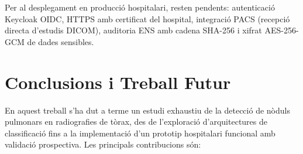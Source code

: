 \documentclass[conference]{IEEEtran}
\begin{document}
Per al desplegament en producció hospitalari, resten pendents: autenticació Keycloak OIDC, HTTPS amb certificat del hospital, integració PACS (recepció directa d'estudis DICOM), auditoria ENS amb cadena SHA-256 i xifrat AES-256-GCM de dades sensibles.

\section{Conclusions i Treball Futur}

En aquest treball s'ha dut a terme un estudi exhaustiu de la detecció de nòduls pulmonars en radiografies de tòrax, des de l'exploració d'arquitectures de classificació fins a la implementació d'un prototip hospitalari funcional amb validació prospectiva. Les principals contribucions són:
\end{document}
